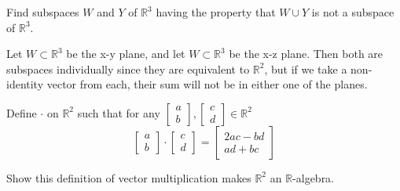 \documentclass{article}
\begin{document}
\setcounter{problem}{103}
\begin{problem}
Find subspaces $W$ and $Y$ of $\mathbb{R}^{3}$ having the property that $W\cup Y$ is not a subspace of $\mathbb{R}^{3}$.
\end{problem}

\begin{solution}
Let $W\subset\mathbb{R}^{3}$ be the x-y plane, and let $W\subset\mathbb{R}^{3}$ be the x-z plane. Then both are subspaces individually since they are equivalent to $\mathbb{R}^{2}$, but if we take a non-identity vector from each, their sum will not be in either one of the planes.
\end{solution}

\setcounter{problem}{116}
\begin{problem}
Define $\cdot$ on $\mathbb{R}^{2}$ such that for any $\begin{bmatrix}
a \\
b
\end{bmatrix},
\begin{bmatrix}
c \\
d
\end{bmatrix}
\in \mathbb{R}^{2}$
\[
\begin{bmatrix}
a \\
b
\end{bmatrix}
\cdot
\begin{bmatrix}
c \\
d
\end{bmatrix}
=
\begin{bmatrix}
2ac-bd	\\
ad + bc
\end{bmatrix}
\]

Show this definition of vector multiplication makes $\mathbb{R}^{2}$ an $\mathbb{R}$-algebra.
\end{problem}
\end{document}

